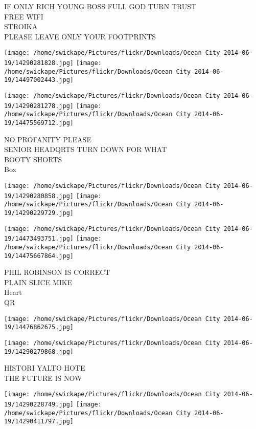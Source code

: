 \documentclass[10pt,letterpaper]{article}
\begin{document}
IF ONLY RICH YOUNG BOSS FULL GOD TURN TRUST\\
FREE WIFI\\
STROIKA\\
PLEASE LEAVE ONLY YOUR FOOTPRINTS\\
\pagebreak

\texttt{[image: /home/swickape/Pictures/flickr/Downloads/Ocean City 2014-06-19/14290281828.jpg]}
\texttt{[image: /home/swickape/Pictures/flickr/Downloads/Ocean City 2014-06-19/14497002443.jpg]}

\texttt{[image: /home/swickape/Pictures/flickr/Downloads/Ocean City 2014-06-19/14290281278.jpg]}
\texttt{[image: /home/swickape/Pictures/flickr/Downloads/Ocean City 2014-06-19/14475569712.jpg]}

NO PROFANITY PLEASE\\
SENIOR HEADQRTS TURN DOWN FOR WHAT\\
BOOTY SHORTS\\
Box\\
\pagebreak

\texttt{[image: /home/swickape/Pictures/flickr/Downloads/Ocean City 2014-06-19/14290280858.jpg]}
\texttt{[image: /home/swickape/Pictures/flickr/Downloads/Ocean City 2014-06-19/14290229729.jpg]}

\texttt{[image: /home/swickape/Pictures/flickr/Downloads/Ocean City 2014-06-19/14473493751.jpg]}
\texttt{[image: /home/swickape/Pictures/flickr/Downloads/Ocean City 2014-06-19/14475667864.jpg]}

PHIL ROBINSON IS CORRECT\\
PLAIN SLICE MIKE\\
Heart\\
QR\\
\pagebreak

\texttt{[image: /home/swickape/Pictures/flickr/Downloads/Ocean City 2014-06-19/14476862675.jpg]}

\vspace{0.25in}
\texttt{[image: /home/swickape/Pictures/flickr/Downloads/Ocean City 2014-06-19/14290279868.jpg]}

HISTORI YALTO HOTE\\
THE FUTURE IS NOW\\
\pagebreak

\texttt{[image: /home/swickape/Pictures/flickr/Downloads/Ocean City 2014-06-19/14290228749.jpg]}
\texttt{[image: /home/swickape/Pictures/flickr/Downloads/Ocean City 2014-06-19/14290411797.jpg]}
\end{document}
